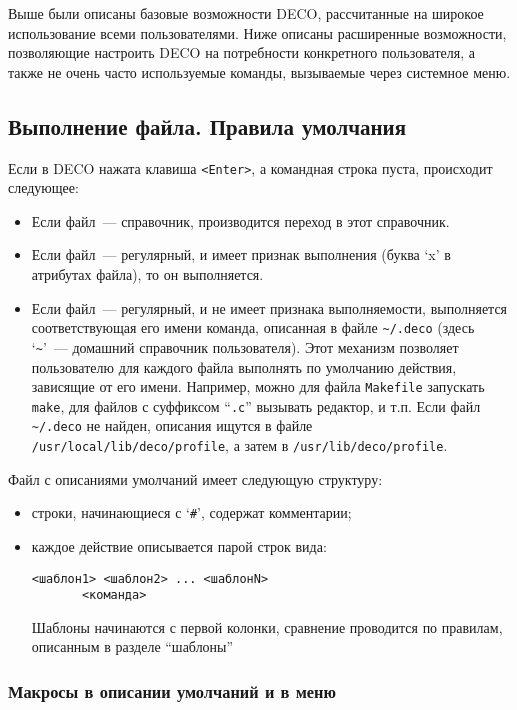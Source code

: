 Выше были описаны базовые возможности DECO, рассчитанные на
широкое использование всеми пользователями. Ниже описаны расширенные
возможности, позволяющие настроить DECO на потребности конкретного
пользователя, а также не очень часто используемые команды, вызываемые
через системное меню.

\subsection{Выполнение файла. Правила умолчания}

Если в DECO нажата клавиша {\tt <Enter>}, а командная строка пуста,
происходит следующее:
\begin{itemize}
\item
Если файл~--- справочник, производится переход в этот справочник.
\item
Если файл~--- регулярный, и имеет признак выполнения (буква `x' в
атрибутах файла), то он выполняется.
\item
Если файл~--- регулярный, и не имеет признака выполняемости,
выполняется соответствующая его имени
команда, описанная в файле {\tt \~{}/.deco} (здесь `{\tt \~{}}'~--- домашний
справочник пользователя). Этот механизм позволяет
пользователю для каждого файла выполнять по умолчанию
действия, зависящие от его имени. Например, можно для
файла {\tt Makefile} запускать {\tt make}, для файлов с суффиксом ``{\tt .c}''
вызывать редактор, и т.п. Если файл {\tt \~{}/.deco} не найден,
описания ищутся в файле {\tt /usr/local/lib/deco/profile}, а затем
в {\tt /usr/lib/deco/profile}.
\end{itemize}

Файл с описаниями умолчаний имеет следующую структуру:

\begin{itemize}
\item
строки, начинающиеся с `{\tt \#}', содержат комментарии;
\item
каждое действие описывается парой строк вида:
\begin{source}
\begin{verbatim}
<шаблон1> <шаблон2> ... <шаблонN>
       <команда>
\end{verbatim}
\end{source}
Шаблоны начинаются с первой колонки, сравнение проводится
по правилам, описанным в разделе ``шаблоны''
\end{itemize}

\subsubsection{Макросы в описании умолчаний и в меню}

